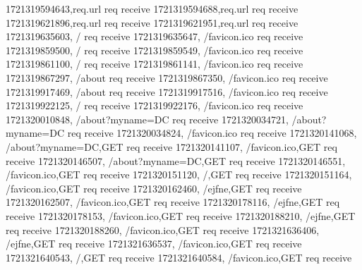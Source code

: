 1721319594643,{req.url} req receive
1721319594688,{req.url} req receive
1721319621896,{req.url} req receive
1721319621951,{req.url} req receive
1721319635603, / req receive
1721319635647, /favicon.ico req receive
1721319859500, / req receive
1721319859549, /favicon.ico req receive
1721319861100, / req receive
1721319861141, /favicon.ico req receive
1721319867297, /about req receive
1721319867350, /favicon.ico req receive
1721319917469, /about req receive
1721319917516, /favicon.ico req receive
1721319922125, / req receive
1721319922176, /favicon.ico req receive
1721320010848, /about?myname=DC req receive
1721320034721, /about?myname=DC req receive
1721320034824, /favicon.ico req receive
1721320141068, /about?myname=DC,GET req receive
1721320141107, /favicon.ico,GET req receive
1721320146507, /about?myname=DC,GET req receive
1721320146551, /favicon.ico,GET req receive
1721320151120, /,GET req receive
1721320151164, /favicon.ico,GET req receive
1721320162460, /ejfne,GET req receive
1721320162507, /favicon.ico,GET req receive
1721320178116, /ejfne,GET req receive
1721320178153, /favicon.ico,GET req receive
1721320188210, /ejfne,GET req receive
1721320188260, /favicon.ico,GET req receive
1721321636406, /ejfne,GET req receive
1721321636537, /favicon.ico,GET req receive
1721321640543, /,GET req receive
1721321640584, /favicon.ico,GET req receive

